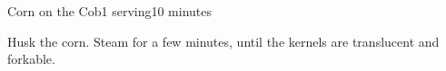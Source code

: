 \documentclass[../Cookbook.tex]{subfiles}
\begin{document}
\begin{recipe}[Corn]{Corn on the Cob}{1 serving}{10 minutes}

  Husk the corn.
  Steam for a few minutes, until the kernels are translucent and forkable.

\end{recipe}
\end{document}
